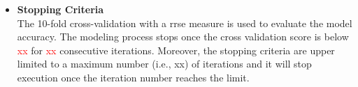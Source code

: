 \begin{itemize}
 



\item \textbf{Stopping Criteria} \\
The 10-fold cross-validation with a \gls{rrse} measure is used to evaluate the model accuracy. The modeling process stops once the cross validation score is below \textcolor{red}{xx} for \textcolor{red}{xx} consecutive iterations. Moreover, the stopping criteria are upper limited to a maximum number (i.e., xx) of iterations and it will stop execution once the iteration number reaches the limit.




\end{itemize}











